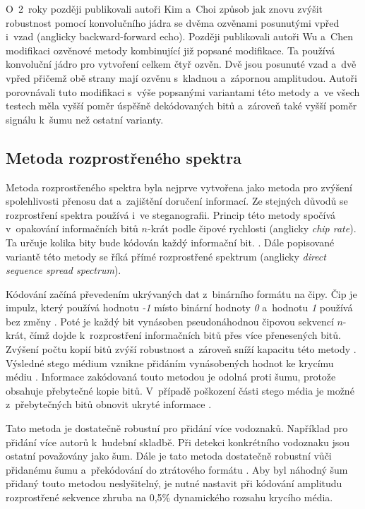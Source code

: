 O~2~roky později publikovali autoři Kim a~Choi \cite{Kim2003} způsob jak znovu
zvýšit robustnost pomocí konvolučního jádra se dvěma ozvěnami posunutými vpřed
i~vzad (anglicky backward-forward echo). Později publikovali autoři Wu a~Chen
\cite{Wu2006} modifikaci ozvěnové metody kombinující již popsané modifikace. Ta
používá konvoluční jádro pro vytvoření celkem čtyř ozvěn. Dvě jsou posunuté
vzad a~dvě vpřed přičemž obě strany mají ozvěnu s~kladnou a~zápornou
amplitudou. Autoři porovnávali tuto modifikaci s~výše popsanými variantami této
metody a~ve všech testech měla vyšší poměr úspěšně dekódovaných bitů a~zároveň
také vyšší poměr signálu k~šumu než ostatní varianty.

\subsection*{Metoda rozprostřeného spektra}
\label{sub:dsss}

Metoda rozprostřeného spektra byla nejprve vytvořena jako metoda pro zvýšení
spolehlivosti přenosu dat a~zajištění doručení informací. Ze stejných důvodů se
rozprostření spektra používá i~ve steganografii. Princip této metody spočívá
v~opakování informačních bitů $n$-krát podle čipové rychlosti (anglicky
\textit{chip rate}). Ta určuje kolika bity bude kódován každý informační bit.
\cite{AlSabhany2020}. Dále popisované variantě této metody se říká přímé
rozprostřené spektrum (anglicky \textit{direct sequence spread spectrum}).

Kódování začíná převedením ukrývaných dat z~binárního formátu na čipy. Čip je
impulz, který používá hodnotu \textit{-1} místo binární hodnoty \textit{0}
a~hodnotu \textit{1} používá bez změny \cite{Kuznetsov2022}. Poté je každý bit
vynásoben pseudonáhodnou čipovou sekvencí $n$-krát, čímž
dojde k~rozprostření informačních bitů přes více přenesených bitů. Zvýšení
počtu kopií bitů zvýší robustnost a~zároveň sníží kapacitu této metody
\cite{AlSabhany2020}. Výsledné stego médium vznikne přidáním vynásobených
hodnot ke krycímu médiu \cite{Kuznetsov2022}. Informace zakódovaná touto
metodou je odolná proti šumu, protože obsahuje přebytečné kopie bitů. V~případě
poškození části stego média je možné z~přebytečných bitů obnovit ukryté
informace \cite{Djebbar2012}.

Tato metoda je dostatečně robustní pro přidání více vodoznaků. Například pro
přidání více autorů k~hudební skladbě. Při detekci konkrétního vodoznaku jsou
ostatní považovány jako šum. Dále je tato metoda dostatečně robustní vůči
přidanému šumu a~překódování do ztrátového formátu \cite{Boney1996}. Aby byl
náhodný šum přidaný touto metodou neslyšitelný, je nutné nastavit při kódování
amplitudu rozprostřené sekvence zhruba na 0,5\% dynamického rozsahu krycího
média.

